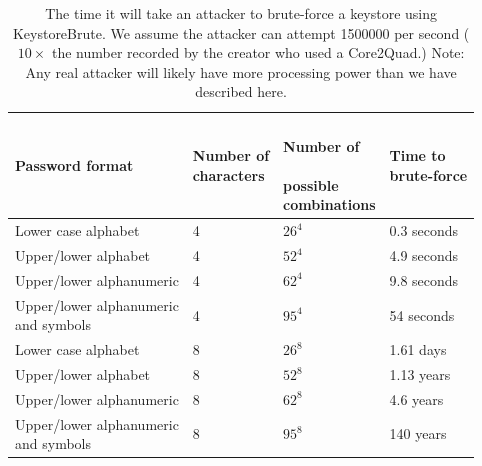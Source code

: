 \documentclass[12pt, titlepage]{article}
\begin{document}
\begin{center}
\begin{table}[h!]
    \begin{tabular}{ | l | l | l | l |}
    \hline
    \textbf{Password format} & \shortstack{\textbf{Number of} \\ \textbf{characters}} & \shortstack{\\ \textbf{Number of} \\ \\ \textbf{possible} \\ \textbf{combinations}} & \shortstack{\textbf{Time to} \\ \textbf{brute-force}} \\ \hline
    Lower case alphabet  & 4 & $26^4$ & 0.3 seconds \\ \hline
    Upper/lower alphabet  & 4 & $52^4$ & 4.9 seconds \\ \hline
    Upper/lower alphanumeric & 4 & $62^4$ & 9.8 seconds \\ \hline
    \shortstack{Upper/lower alphanumeric \\ and symbols}  & 4 & $95^4$ & 54 seconds \\ \hline
    Lower case alphabet  & 8 & $26^8$ & 1.61 days \\ \hline
    Upper/lower alphabet  & 8 & $52^8$ & 1.13 years \\ \hline
    Upper/lower alphanumeric & 8 & $62^8$ & 4.6 years \\ \hline
    \shortstack{Upper/lower alphanumeric \\ and symbols}  & 8 & $95^8$ & 140 years \\ \hline
    
    \end{tabular}
    \caption{The time it will take an attacker to brute-force a keystore using KeystoreBrute. We assume the attacker can attempt 1500000 per second ($10 \times$ the number recorded by the creator who used a Core2Quad.)
    \newline Note: Any real attacker will likely have more processing power than we have described here.} \label{tab:keystoreBruteforce}
    \end{table}
\end{center}
\end{document}
